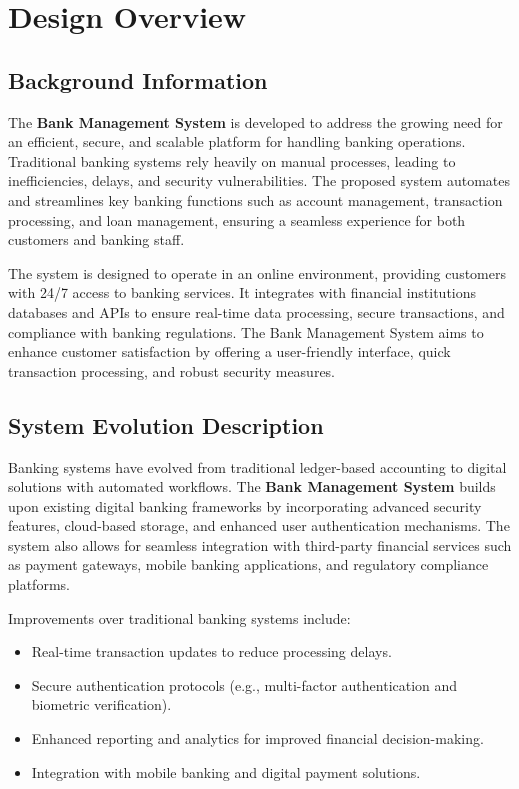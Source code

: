\section{Design Overview}\label{design-overview}

\subsection{Background Information}\label{background-information}

The \textbf{Bank Management System} is developed to address the growing
need for an efficient, secure, and scalable platform for handling
banking operations. Traditional banking systems rely heavily on manual
processes, leading to inefficiencies, delays, and security
vulnerabilities. The proposed system automates and streamlines key
banking functions such as account management, transaction processing,
and loan management, ensuring a seamless experience for both customers
and banking staff.

The system is designed to operate in an online environment, providing
customers with 24/7 access to banking services. It integrates with
financial institutions databases and APIs to ensure real-time data
processing, secure transactions, and compliance with banking
regulations. The Bank Management System aims to enhance customer
satisfaction by offering a user-friendly interface, quick transaction
processing, and robust security measures.

\subsection{System Evolution
Description}\label{system-evolution-description}

Banking systems have evolved from traditional ledger-based accounting to
digital solutions with automated workflows. The \textbf{Bank Management
System} builds upon existing digital banking frameworks by incorporating
advanced security features, cloud-based storage, and enhanced user
authentication mechanisms. The system also allows for seamless
integration with third-party financial services such as payment
gateways, mobile banking applications, and regulatory compliance
platforms.

Improvements over traditional banking systems include:

\begin{itemize}
\item
  Real-time transaction updates to reduce processing delays.
\item
  Secure authentication protocols (e.g., multi-factor authentication and
  biometric verification).
\item
  Enhanced reporting and analytics for improved financial
  decision-making.
\item
  Integration with mobile banking and digital payment solutions.
\end{itemize}

